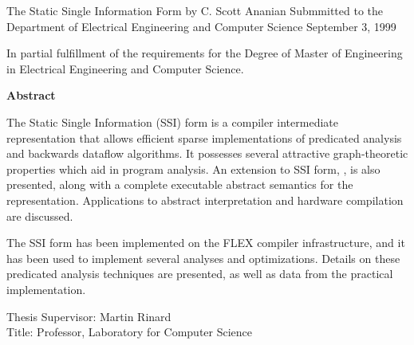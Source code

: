 \documentclass[12pt,titlepage,twoside]{article}
\begin{document}
{%
\begin{center}
The Static Single Information Form\tight
by\tight
C. Scott Ananian\nl
Submmitted to the\tight
Department of Electrical Engineering and Computer Science\nl
September 3, 1999\nl
\end{center}

\begin{flushleft}
In partial fulfillment of the requirements for the Degree of Master of
Engineering in Electrical Engineering and Computer Science.
\end{flushleft}

\vspace{0.75cm}
\centerline{\LARGE\textbf{Abstract}}
\vspace{0.3cm}

The Static Single Information (SSI) form is a compiler intermediate
representation that allows efficient sparse implementations of
predicated analysis and backwards dataflow algorithms.  It possesses
several attractive graph-theoretic properties which aid in program
analysis.  An extension to SSI form, \ssiplus, is also presented,
along with a complete executable abstract semantics for the
representation.  Applications to abstract interpretation and hardware
compilation are discussed.

The SSI form has been implemented on the FLEX compiler infrastructure,
and it has been used to implement several analyses and optimizations.
Details on these predicated analysis techniques are presented, as well
as data from the practical implementation.

\vspace{0.5cm}
\begin{flushleft}
Thesis Supervisor: Martin Rinard\\
Title: Professor, Laboratory for Computer Science\\
\end{flushleft}
}\clearpage
\tableofcontents\listoffigures\listoftables\listofalgorithms\cleardoublepage
\end{document}

